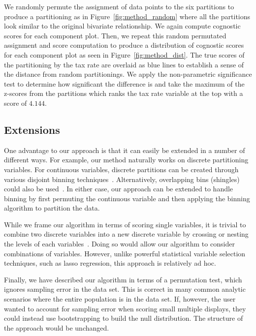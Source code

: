 We randomly permute the assignment of data points to the six partitions to produce a partitioning as in Figure~\ref{fig:method_random} where all the partitions look similar to the original bivariate relationship. We again compute cognostic scores for each component plot. Then, we repeat this random permutated assignment and score computation to produce a distribution of cognostic scores for each component plot as seen in Figure~\ref{fig:method_dist}. The true scores of the partitioning by the tax rate are overlaid as blue lines to establish a sense of the distance from random partitionings. We apply the non-parametric significance test to determine how significant the difference is and take the maximum of the z-scores from the partitions which ranks the tax rate variable at the top with a score of $4.144$.

\subsection{Extensions}
One advantage to our approach is that it can easily be extended in a number of different ways. For example, our method naturally works on discrete partitioning variables. For continuous variables, discrete partitions can be created through various disjoint binning techniques~\cite{Freedman1981,Scott2009}. Alternatively, overlapping bins (shingles) could also be used~\cite{Becker1996}. In either case, our approach can be extended to handle binning by first permuting the continuous variable and then applying the binning algorithm to partition the data.

While we frame our algorithm in terms of scoring single variables, it is trivial to combine two discrete variables into a new discrete variable by crossing or nesting the levels of each variables~\cite{Wilkinson2005GG,Stolte2002}. Doing so would allow our algorithm to consider combinations of variables. However, unlike powerful statistical variable selection techniques, such as lasso regression, this approach is relatively ad hoc.

Finally, we have described our algorithm in terms of a permutation test, which ignores sampling error in the data set. This is correct in many common analytic scenarios where the entire population is in the data set. If, however, the user wanted to account for sampling error when scoring small multiple displays, they could instead use bootstrapping to build the null distribution. The structure of the approach would be unchanged.

